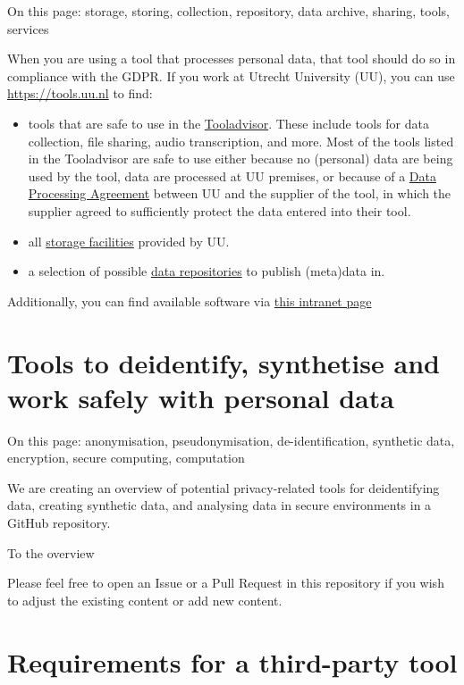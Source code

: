 \documentclass[
]{book}
\providecommand{\tightlist}{%
  \setlength{\itemsep}{0pt}\setlength{\parskip}{0pt}}
\begin{document}
On this page: storage, storing, collection, repository, data archive, sharing,
tools, services

When you are using a tool that processes personal data, that tool should do so
in compliance with the GDPR. If you work at Utrecht University (UU), you can use
\url{https://tools.uu.nl} to find:

\begin{itemize}
\tightlist
\item
  tools that are safe to use in the \href{https://tools.uu.nl/tooladvisor}{Tooladvisor}.
  These include tools for data collection, file sharing, audio transcription, and more.
  Most of the tools listed in the Tooladvisor are safe to use either because no (personal)
  data are being used by the tool, data are processed at UU premises, or because
  of a \protect\hyperlink{data-processing-agreement}{Data Processing Agreement} between
  UU and the supplier of the tool, in which the supplier agreed to
  sufficiently protect the data entered into their tool.
\item
  all \href{https://tools.uu.nl/storagefinder/}{storage facilities}
  provided by UU.
\item
  a selection of possible \href{https://tools.uu.nl/repository-decision-tool/}{data repositories}
  to publish (meta)data in.
\end{itemize}

Additionally, you can find available software via
\href{https://intranet.uu.nl/en/knowledgebase/software-at-work-teaching-rooms-and-home}{this intranet page}

\hypertarget{tool-repository}{%
\section{Tools to deidentify, synthetise and work safely with personal data}\label{tool-repository}}

On this page: anonymisation, pseudonymisation, de-identification, synthetic data, encryption,
secure computing, computation

We are creating an overview of potential privacy-related tools for
deidentifying data, creating synthetic data, and analysing data in secure
environments in a GitHub repository.

To the overview

Please feel free to open an Issue or a Pull Request in this repository if you
wish to adjust the existing content or add new content.

\hypertarget{tool-requirements}{%
\section{Requirements for a third-party tool}\label{tool-requirements}}
\end{document}
